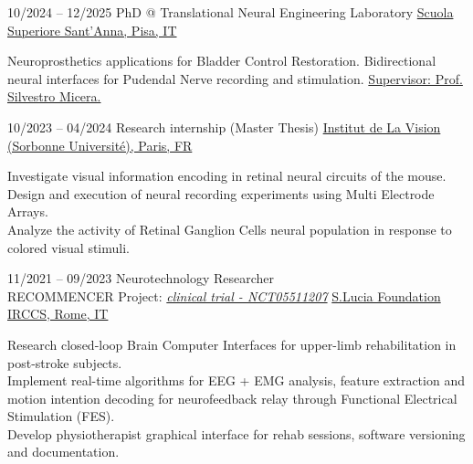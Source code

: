 \documentclass[9pt]{developercv} %
\begin{document}
\begin{entrylist}

    \entry
        {10/2024 -- 12/2025}
		{PhD @ Translational Neural Engineering Laboratory}
		{\textcolor{darkgray}{{\href{https://www.santannapisa.it/en/institute/biorobotics/bioelectronics-and-bioengineering-area}{Scuola Superiore Sant'Anna, Pisa, IT}}}}
		{\vspace{-10pt}
        \begin{itemize}[noitemsep,topsep=0pt,parsep=0pt,partopsep=0pt, leftmargin=-1pt]
            Neuroprosthetics applications for Bladder Control Restoration. Bidirectional neural interfaces for Pudendal Nerve recording and stimulation. \underline{Supervisor: Prof. Silvestro Micera.}
            
        \end{itemize} 
        }

	\entry
        {10/2023 -- 04/2024}
		{Research internship (Master Thesis)}
		{\textcolor{darkgray}{{\href{https://www.institut-vision.org/en/}{Institut de La Vision (Sorbonne Université), Paris, FR}}}}
		{\vspace{-10pt}
        \begin{itemize}[noitemsep,topsep=0pt,parsep=0pt,partopsep=0pt, leftmargin=-1pt]
            Investigate visual information encoding in retinal neural circuits of the mouse.\\
            \textbullet{}  Design and execution of neural recording experiments using Multi Electrode Arrays.\\
            \textbullet{}  Analyze the activity of Retinal Ganglion Cells neural population in response to colored visual stimuli.
        \end{itemize} 
        }
        
	\entry
		{11/2021 -- 09/2023}
		{Neurotechnology Researcher \\\footnotesize{RECOMMENCER Project: \textit{\textcolor{darkgray}{\href{https://clinicaltrials.gov/study/NCT05511207}{clinical trial - NCT05511207}}}}}
		{\textcolor{darkgray}{\href{https://www.hsantalucia.it/laboratorio-immagini-neuroelettriche-interfacce-cervello-computer}{S.Lucia Foundation IRCCS, Rome, IT}}}
		{\vspace{-10pt}
        \begin{itemize}[noitemsep,topsep=0pt,parsep=0pt,partopsep=0pt, leftmargin=-1pt]
            Research closed-loop Brain Computer Interfaces for upper-limb rehabilitation in post-stroke subjects.\\
            \textbullet{}  Implement real-time algorithms for EEG + EMG analysis, feature extraction and motion intention decoding for neurofeedback relay through Functional Electrical Stimulation (FES).\\
            \textbullet{}  Develop physiotherapist graphical interface for rehab sessions, software versioning and documentation.
        \end{itemize} 
        }
\end{entrylist}
\end{document}
